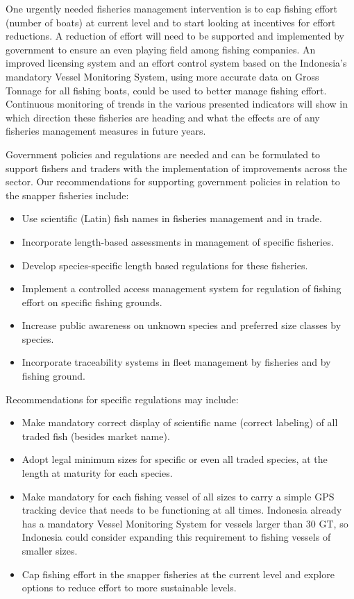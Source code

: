 One urgently needed fisheries management intervention is to cap fishing effort (number of boats) at current level and to start looking at incentives for effort reductions. A reduction of effort will need to be supported and implemented by government to ensure an even playing field among fishing companies. An improved licensing system and an effort control system based on the Indonesia's mandatory Vessel Monitoring System, using more accurate data on Gross Tonnage for all fishing boats, could be used to better manage fishing effort. Continuous monitoring of trends in the various presented indicators will show in which direction these fisheries are heading and what the effects are of any fisheries management measures in future years.

Government policies and regulations are needed and can be formulated to support fishers and traders with the implementation of improvements across the sector. Our recommendations for supporting government policies in relation to the snapper fisheries include:
\parskip=1pt
\begin{itemize}[noitemsep,topsep=0pt,parsep=0pt,partopsep=0pt]
\item Use scientific (Latin) fish names in fisheries management and in trade.
\item Incorporate length-based assessments in management of specific fisheries.
\item Develop species-specific length based regulations for these fisheries.
\item Implement a controlled access management system for regulation of fishing effort on specific fishing grounds.
\item Increase public awareness on unknown species and preferred size classes by species.
\item Incorporate traceability systems in fleet management by fisheries and by fishing ground.
\end{itemize}

\noindent Recommendations for specific regulations may include:
\begin{itemize}[noitemsep,topsep=0pt,parsep=0pt,partopsep=0pt]
\item Make mandatory correct display of scientific name (correct labeling) of all traded fish (besides market name).
\item Adopt legal minimum sizes for specific or even all traded species, at the length at maturity for each species.
\item Make mandatory for each fishing vessel of all sizes to carry a simple GPS tracking device that needs to be functioning at all times. Indonesia already has a mandatory Vessel Monitoring System for vessels larger than 30 GT, so Indonesia could consider expanding this requirement to fishing vessels of smaller sizes.
\item Cap fishing effort in the snapper fisheries at the current level and explore options to reduce effort to more sustainable levels.
\end{itemize}
